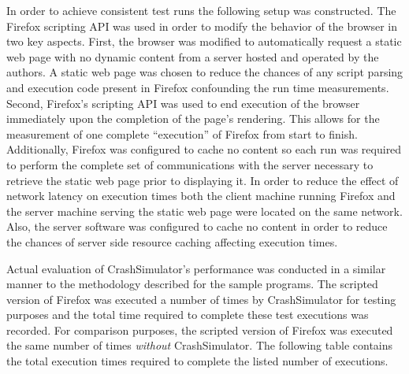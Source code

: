                 In order to achieve consistent test runs the following setup was constructed. The Firefox scripting API
                was used in order to modify the behavior of the browser in two key aspects. First, the browser was
                modified to automatically request a static web page with no dynamic content from a server hosted and
                operated by the authors. A static web page was chosen to reduce the chances of any script parsing and
                execution code present in Firefox confounding the run time measurements. Second, Firefox's scripting API
                was used to end execution of the browser immediately upon the completion of the page's rendering. This
                allows for the measurement of one complete ``execution'' of Firefox from start to finish. Additionally,
                Firefox was configured to cache no content so each run was required to perform the complete set of
                communications with the server necessary to retrieve the static web page prior to displaying it. In
                order to reduce the effect of network latency on execution times both the client machine running Firefox
                and the server machine serving the static web page were located on the same network. Also, the server
                software was configured to cache no content in order to reduce the chances of server side resource
                caching affecting execution times.

                Actual evaluation of CrashSimulator's performance was conducted in a similar manner to the methodology
                described for the sample programs. The scripted version of Firefox was executed a number of times by
                CrashSimulator for testing purposes and the total time required to complete these test executions was
                recorded. For comparison purposes, the scripted version of Firefox was executed the same number of times
                \emph{without} CrashSimulator.  The following table contains the total execution times required to
                complete the listed number of executions.

